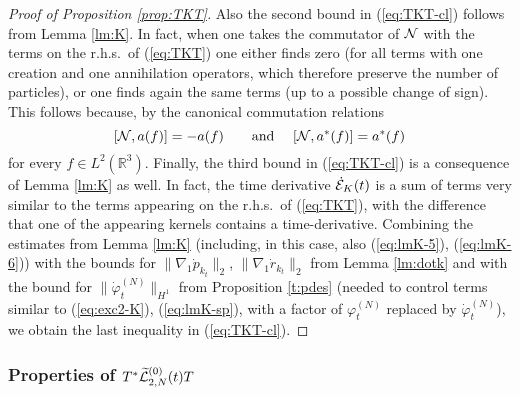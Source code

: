 \documentclass[11pt,a4paper]{article}
\newcommand{\ekt}{e^{K\lvert t\rvert}}	%
\newcommand{\bR}{{\mathbb R}}
\newcommand{\wt}{\widetilde}
\newcommand{\cE}{{\cal E}}
\newcommand{\cL}{{\cal L}}
\newcommand{\cN}{{\cal N}}
\newcommand{\norm}[1]{\lVert#1\rVert}	%
\newcommand{\ph}{\varphi_t^{(N)}}	%
\begin{document}
\begin{proof}[Proof of Proposition \ref{prop:TKT}]
Also the second bound in (\ref{eq:TKT-cl}) follows from Lemma \ref{lm:K}. In fact, when one takes the commutator of $\cN$ with the terms on the r.h.s.\ of (\ref{eq:TKT}) one either finds zero (for all terms with one creation and one annihilation operators, which therefore preserve the number of particles), or one finds again the same terms (up to a possible change of sign). This follows because, by the canonical commutation relations
\[ [ \cN , a (f) ] = - a (f) \qquad \text{and } \quad [\cN , a^* (f)] = a^* (f) \]
for every $f \in L^2 (\bR^3)$. Finally, the third bound in (\ref{eq:TKT-cl}) is a consequence of Lemma \ref{lm:K} as well. In fact, the time derivative $\dot{\cE}_K (t)$ is a sum of terms very similar to the terms appearing on the r.h.s.\ of (\ref{eq:TKT}), with the difference that one of the appearing kernels contains a time-derivative. Combining the estimates from Lemma \ref{lm:K} (including, in this case, also (\ref{eq:lmK-5}), (\ref{eq:lmK-6})) with the bounds for $\| \nabla_1 \dot{p}_{k_t} \|_2$, $\| \nabla_1 \dot{r}_{k_t} \|_2$ from Lemma \ref{lm:dotk} and with the bound for $\| \dot{\varphi}_t^{(N)} \|_{H^1}$ from  Proposition \ref{t:pdes} (needed to control terms similar to (\ref{eq:exc2-K}), (\ref{eq:lmK-sp}), with 
a factor of $\varphi^{(N)}_t$ replaced by $\dot{\varphi}^{(N)}_t$), we obtain the last inequality in (\ref{eq:TKT-cl}). 
\end{proof}

\subsubsection{Properties of $T^* \wt{\cL}_{2,N}^{(0)} (t) T$}
\end{document}
